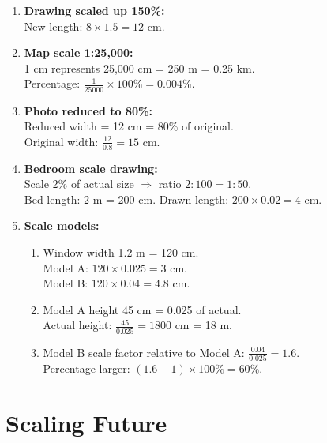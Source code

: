 \documentclass[12pt]{article}
\begin{document}
\begin{enumerate}[resume]
    \item \textbf{Drawing scaled up 150\%:} \\
    New length: \( 8 \times 1.5 = 12\) cm.

    \item \textbf{Map scale 1:25,000:} \\
    1 cm represents 25,000 cm = 250 m = 0.25 km. \\
    Percentage: \( \frac{1}{25000} \times 100\% = 0.004\% \).

    \item \textbf{Photo reduced to 80\%:} \\
    Reduced width = 12 cm = 80\% of original. \\
    Original width: \( \frac{12}{0.8} = 15\) cm.

    \item \textbf{Bedroom scale drawing:} \\
    Scale 2\% of actual size \(\Rightarrow\) ratio \( 2:100 = 1:50 \). \\
    Bed length: 2 m = 200 cm. Drawn length: \( 200 \times 0.02 = 4\) cm.

    \item \textbf{Scale models:}
    \begin{enumerate}
        \item Window width 1.2 m = 120 cm. \\
        Model A: \( 120 \times 0.025 = 3\) cm. \\
        Model B: \( 120 \times 0.04 = 4.8\) cm.
        \item Model A height 45 cm = 0.025 of actual. \\
        Actual height: \( \frac{45}{0.025} = 1800\) cm = 18 m.
        \item Model B scale factor relative to Model A: \( \frac{0.04}{0.025} = 1.6 \). \\
        Percentage larger: \( (1.6 - 1) \times 100\% = 60\%\).
    \end{enumerate}
\end{enumerate}

\section*{Scaling Future}
\end{document}
